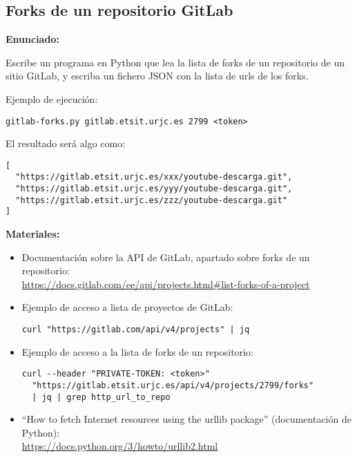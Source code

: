 \subsection{Forks de un repositorio GitLab}
\label{subsec:json-gitlab-forks}

\textbf{Enunciado:}

Escribe un programa en Python que lea la lista de forks de un repositorio de un sitio GitLab, y escriba un fichero JSON con la lista de urls de los forks.

Ejemplo de ejecución:

\begin{verbatim}
gitlab-forks.py gitlab.etsit.urjc.es 2799 <token>
\end{verbatim}

El resultado será algo como:

\begin{verbatim}
[
  "https://gitlab.etsit.urjc.es/xxx/youtube-descarga.git",
  "https://gitlab.etsit.urjc.es/yyy/youtube-descarga.git",
  "https://gitlab.etsit.urjc.es/zzz/youtube-descarga.git"
]
\end{verbatim}

\textbf{Materiales:}

\begin{itemize}
\item Documentación sobre la API de GitLab, apartado sobre forks de un repositorio: \\
\url{https://docs.gitlab.com/ee/api/projects.html#list-forks-of-a-project}

\item Ejemplo de acceso a lista de proyectos de GitLab:
  
\begin{verbatim}
curl "https://gitlab.com/api/v4/projects" | jq
\end{verbatim}

\item Ejemplo de acceso a la lista de forks de un repositorio:
  
\begin{verbatim}
curl --header "PRIVATE-TOKEN: <token>"
  "https://gitlab.etsit.urjc.es/api/v4/projects/2799/forks"
  | jq | grep http_url_to_repo
\end{verbatim}

\item ``How to fetch Internet resources using the urllib package''
  (documentación de Python): \\
  \url{https://docs.python.org/3/howto/urllib2.html}
\end{itemize}

